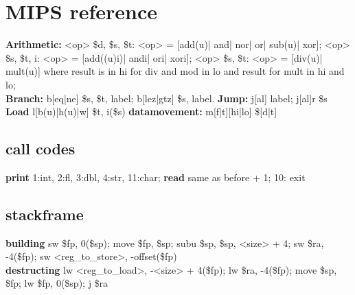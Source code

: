 \section{MIPS reference}
\textbf{Arithmetic:} <op> \$d, \$s, \$t: <op> = [add(u)| and| nor| or| sub(u)| xor]; <op> \$s, \$t, i: <op> = [add((u)i)| andi| ori| xori]; <op> \$s, \$t: <op> = [div(u)| mult(u)] where result is in hi for div and mod in lo and result for mult in hi and lo;\\
\textbf{Branch:} b[eq|ne] \$s, \$t, label; b[lez|gtz] \$s, label. \textbf{Jump:} j[al] label; j[al]r \$s\\
\textbf{Load} l[b(u)|h(u)|w] \$t, i(\$s) \textbf{datamovement:} m[f|t][hi|lo] \$[d|t]
\subsection*{call codes}
\textbf{print} 1:int, 2:fl, 3:dbl, 4:str, 11:char; \textbf{read} same as before + 1; 10: exit
\subsection*{stackframe}
\textbf{building} sw \$fp, 0(\$sp); move \$fp, \$sp; subu \$sp, \$sp, <size> + 4; sw \$ra, -4(\$fp); sw <reg\_to\_store>, -offset(\$fp)\\
\textbf{destructing} lw <reg\_to\_load>, -<size> + 4(\$fp); lw \$ra, -4(\$fp); move \$sp, \$fp; lw \$fp, 0(\$sp); j \$ra
